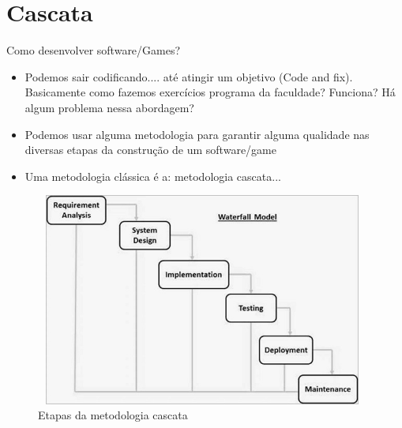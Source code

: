 \section{Cascata}

\begin{frame}
\begin{block}{Como desenvolver software/Games?}
	 \begin{itemize}
			  \item Podemos sair codificando.... até atingir um objetivo (Code and fix). Basicamente como fazemos 	exercícios programa da faculdade? Funciona? Há algum problema nessa abordagem?
			  \item Podemos usar alguma metodologia para garantir alguma qualidade nas diversas etapas da construção de um software/game
			  \item Uma metodologia clássica é a: metodologia cascata...
	 \end{itemize}
\end{block}
\end{frame}

\begin{frame}
\begin{block}{}
	 \begin{figure}[!htb]
			\centering	  				
			\includegraphics[height=7cm, width = 11cm]{./pic/sdlc_waterfall_model.jpg}
			\caption{Etapas da metodologia cascata \cite{TUTORIALSPOINT}}
			\label{fig_cascata}
		\end{figure}
\end{block}
\end{frame}



